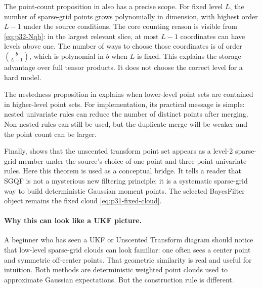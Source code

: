 \documentclass[11pt]{article}
\numberwithin{equation}{section}
\begin{document}
The point-count proposition in \citet[Proposition 3.1]{jia2012sparsegrid}
also has a precise scope.  For fixed level \(L\), the number of sparse-grid
points grows polynomially in dimension, with highest order \(L-1\) under the
source conditions.  The core counting reason is visible from
\eqref{eq:p32-Nqb}: in the largest relevant slice, at most \(L-1\) coordinates
can have levels above one.  The number of ways to choose those coordinates is
of order \(\binom{b}{L-1}\), which is polynomial in \(b\) when \(L\) is fixed.
This explains the storage advantage over full tensor products.  It does not
choose the correct level for a hard model.

The nestedness proposition in \citet[Proposition 3.2]{jia2012sparsegrid}
explains when lower-level point sets are contained in higher-level point sets.
For implementation, its practical message is simple: nested univariate rules
can reduce the number of distinct points after merging.  Non-nested rules can
still be used, but the duplicate merge will be weaker and the point count can
be larger.

Finally, \citet[Theorem 3.2]{jia2012sparsegrid} shows that the unscented
transform point set appears as a level-2 sparse-grid member under the source's
choice of one-point and three-point univariate rules.  Here this theorem is
used as a conceptual bridge.  It tells a reader that SGQF is not a mysterious
new filtering principle; it is a systematic sparse-grid way to build
deterministic Gaussian moment points.  The selected BayesFilter object remains
the fixed cloud \eqref{eq:p31-fixed-cloud}.

\paragraph{Why this can look like a UKF picture.}
A beginner who has seen a UKF or Unscented Transform diagram should notice that
low-level sparse-grid clouds can look familiar: one often sees a center point and
symmetric off-center points.  That geometric similarity is real and useful for
intuition.  Both methods are deterministic weighted point clouds used to
approximate Gaussian expectations.  But the construction rule is different.
\end{document}
